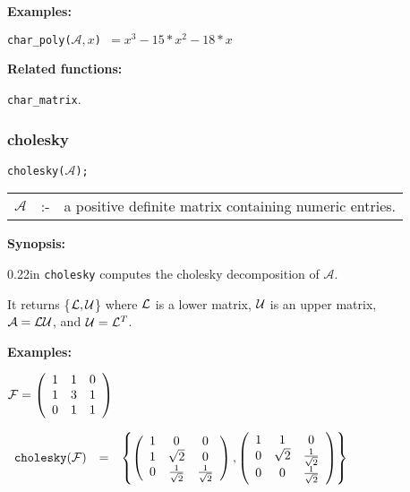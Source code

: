 {\bf Examples:}

\hspace*{0.175in}
{\tt char\_poly($\mathcal{A},x$) $= x^3-15*x^2-18*x$} 

{\bf Related functions:}

\hspace*{0.175in} {\tt char\_matrix}. 


\subsubsection{cholesky}
\label{linalg:cholesky}

\hspace*{0.175in} {\tt cholesky($\mathcal{A}$);}

\hspace*{0.1in} 
\begin{tabular}{l l l}
$\mathcal{A}$ &:-& a positive definite matrix containing numeric entries.
\end{tabular}

{\bf Synopsis:} %

\begin{addtolength}{\leftskip}{0.22in}
{\tt cholesky} computes the cholesky decomposition of $\mathcal{A}$.

It returns \{${\cal L,U}$\} where ${\cal L}$
is a lower matrix, ${\cal U}$ is an upper matrix, \\ $\mathcal{A} = 
{\cal LU}$, and ${\cal U} = {\cal L}^T$.

\end{addtolength}

{\bf Examples:}

\begin{flushleft}  
\hspace*{0.175in}
\begin{math}  
{\cal F} = \left( \begin{array}{ccc} 1 & 1 & 0 \\ 1 & 3 & 1 \\ 0 & 1 & 
1
\end{array} \right)
\end{math}  
\end{flushleft}

\begin{flushleft}  
\hspace*{0.1in}
\begin{math}  
\begin{array}{ccc}
${\tt cholesky}$({\cal F}) & = & 
\left\{ \left( \begin{array}{ccc} 1 & 0 & 0 \\ 1 & \sqrt{2} & 0 \\ 
0 & \frac{1}{\sqrt{2}} & \frac{1}{\sqrt{2}} \end{array} \right), \left( 
\begin{array}{ccc} 1 & 1 & 0 \\ 0 & \sqrt{2} & \frac{1}{\sqrt{2}} \\ 0 
& 0 & \frac{1}{\sqrt{2}} \end{array} \right)
\right\} \end{array}
\end{math}  
\end{flushleft}

